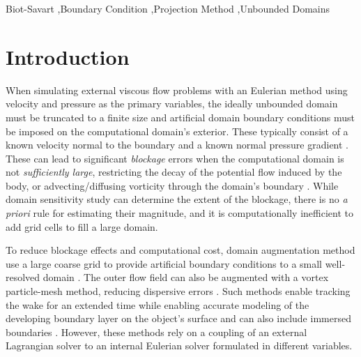 \documentclass[final,1p,times]{elsarticle}
\begin{document}
\begin{frontmatter}
\begin{keyword}
Biot-Savart \sep Boundary Condition \sep Projection Method \sep Unbounded Domains
\end{keyword}

\end{frontmatter}



\section{Introduction}
When simulating external viscous flow problems with an Eulerian method using velocity and pressure as the primary variables, the ideally unbounded domain must be truncated to a finite size and artificial domain boundary conditions must be imposed on the computational domain's exterior. These typically consist of a known velocity normal to the boundary and a known normal pressure gradient \cite{Gresho1987}. These can lead to significant \emph{blockage} errors when the computational domain is not \emph{sufficiently large}, restricting the decay of the potential flow induced by the body, or advecting/diffusing vorticity through the domain's boundary \cite{Colonius2008}. While domain sensitivity study can determine the extent of the blockage, there is no \emph{a priori} rule for estimating their magnitude, and it is computationally inefficient to add grid cells to fill a large domain.

To reduce blockage effects and computational cost, domain augmentation method use a large coarse grid to provide artificial boundary conditions to a small well-resolved domain \cite{Colonius2008}. The outer flow field can also be augmented with a vortex particle-mesh method, reducing dispersive errors \cite{Billuart2023AFlows}. Such methods enable tracking the wake for an extended time while enabling accurate modeling of the developing boundary layer on the object's surface and can also include immersed boundaries \cite{Marichal2015UnboundedMethods}. However, these methods rely on a coupling of an external Lagrangian solver to an internal Eulerian solver formulated in different variables.
\end{document}
